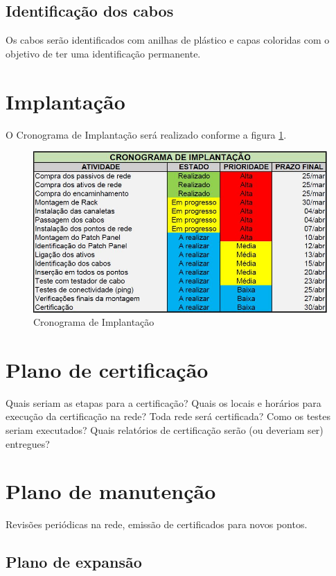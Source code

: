 \documentclass[	DIV=calc,%
							paper=a4,%
							fontsize=12pt,%
							onecolumn]{scrartcl}	 					%
\begin{document}


\subsection{Identificação dos cabos}

Os cabos serão identificados com anilhas de plástico e capas coloridas com o objetivo de ter uma identificação permanente.

\section{Implantação}

O Cronograma de Implantação será realizado conforme a figura \ref{cronograma}.

\begin{figure}
	\centering
	\includegraphics[width=\textwidth]{cronograma}
	\caption{Cronograma de Implantação}
	\label{cronograma}
\end{figure}

\section{Plano de certificação}
Quais seriam as etapas para a certificação? 
Quais os locais e horários para execução da certificação na rede? Toda rede será certificada?
Como os testes seriam executados?
Quais relatórios de certificação serão (ou deveriam ser) entregues? 

\section{Plano de manutenção}

Revisões periódicas na rede, emissão de certificados para novos pontos.

\subsection{Plano de expansão}
\end{document}

